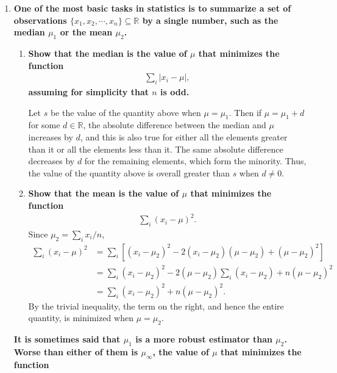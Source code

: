\documentclass[a4paper,12pt]{article}
\begin{document}
\begin{enumerate}
    \item
        \boldmath\textbf{One of the most basic tasks in statistics is to summarize a set of observations $\{ x_1, x_2, \cdots, x_n \} \subseteq \mathbb{R}$ by a single number, such as the median $\mu_1$ or the mean $\mu_2$.
        }\unboldmath
        \begin{enumerate}
            \item
                \boldmath\textbf{Show that the median is the value of $\mu$ that minimizes the function
                \begin{align*}
                    \sum_i |x_i - \mu|,
                \end{align*}
                assuming for simplicity that $n$ is odd.
                }\unboldmath \par
                Let $s$ be the value of the quantity above when $\mu = \mu_1$. Then if $\mu = \mu_1 + d$ for some $d \in \mathbb{R}$, the absolute difference between the median and $\mu$ increases by $d$, and this is also true for either all the elements greater than it or all the elements less than it. The same absolute difference decreases by $d$ for the remaining elements, which form the minority. Thus, the value of the quantity above is overall greater than $s$ when $d \neq 0$.
            \item
                \boldmath\textbf{Show that the mean is the value of $\mu$ that minimizes the function
                \begin{align*}
                    \sum_i (x_i - \mu)^2.
                \end{align*}
                }\unboldmath
                Since $\mu_2 = \sum_i x_i / n$,
                \begin{align*}
                    \sum_i (x_i - \mu)^2 &= \sum_i \left[ (x_i - \mu_2)^2 - 2(x_i - \mu_2)(\mu - \mu_2) + (\mu - \mu_2)^2 \right] \\
                    &= \sum_i (x_i - \mu_2)^2 - 2(\mu - \mu_2) \sum_i (x_i - \mu_2) + n(\mu - \mu_2)^2 \\
                    &= \sum_i (x_i - \mu_2)^2 + n(\mu - \mu_2)^2.
                \end{align*}
                By the trivial inequality, the term on the right, and hence the entire quantity, is minimized when $\mu = \mu_2$.
        \end{enumerate}
        \boldmath\textbf{It is sometimes said that $\mu_1$ is a more robust estimator than $\mu_2$. Worse than either of them is $\mu_\infty$, the value of $\mu$ that minimizes the function
}
\end{enumerate}
\end{document}
